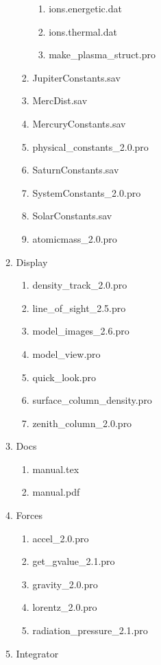 \documentclass[11pt]{article}
\begin{document}
\begin{enumerate}
\begin{enumerate}
\begin{enumerate}
\begin{enumerate}
      \item {\color{red}ions.energetic.dat}
      \item {\color{red}ions.thermal.dat}
      \item {\color{red}make\_plasma\_struct.pro}
      \end{enumerate}
    \item {\color{red}JupiterConstants.sav}
    \item {\color{red}MercDist.sav}
    \item {\color{red}MercuryConstants.sav}
    \item physical\_constants\_2.0.pro
    \item {\color{red}SaturnConstants.sav}
    \item SystemConstants\_2.0.pro
    \item {\color{red}SolarConstants.sav}
    \item atomicmass\_2.0.pro
    \end{enumerate}
  \item {\color{blue}Display}
    \begin{enumerate}
    \item density\_track\_2.0.pro
    \item line\_of\_sight\_2.5.pro
    \item model\_images\_2.6.pro
    \item model\_view.pro
    \item quick\_look.pro
    \item surface\_column\_density.pro
    \item zenith\_column\_2.0.pro
    \end{enumerate}
  \item {\color{blue}Docs}
    \begin{enumerate}
    \item manual.tex
    \item manual.pdf
    \end{enumerate}
  \item {\color{blue}Forces}
    \begin{enumerate}
    \item accel\_2.0.pro
    \item get\_gvalue\_2.1.pro
    \item gravity\_2.0.pro
    \item lorentz\_2.0.pro
    \item radiation\_pressure\_2.1.pro
    \end{enumerate}
  \item {\color{blue}Integrator}

\end{enumerate}
\end{enumerate}
\end{document}
